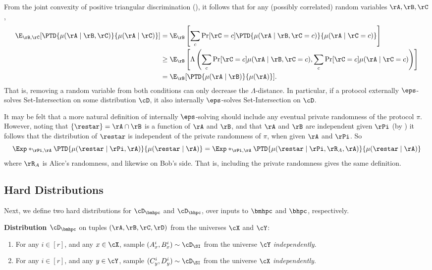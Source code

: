\begin{observation}\label{obs:eps-solving-remove-conditioning}
    From the joint convexity of positive triangular discrimination (), it follows that for any (possibly correlated) random variables $\rA, \rB, \rC$,
\begin{align*}
    \E_{\rB,\rC}[\PTD{\mu(\rA\mid \rB,\rC)}{\mu(\rA\mid \rC)}] %
    & = \E_{\rB}\left[\sum_{c} \Pr[\rC =c] \PTD{\mu(\rA\mid \rB,\rC=c)}{\mu(\rA\mid \rC=c)}\right] \\
    & \ge \E_{\rB}\left[\Lambda\left(\sum_{c} \Pr[\rC =c]\mu(\rA\mid \rB,\rC=c), \sum_{c} \Pr[\rC =c]\mu(\rA\mid \rC=c)\right)\right]\\
    & = \E_{\rB}[\PTD{\mu(\rA\mid \rB)}{\mu(\rA)}].
\end{align*}
That is, removing a random variable from both conditions can only decrease the $\Lambda$-distance. In particular, if a protocol externally $\eps$-solves Set-Intersection on some distribution $\cD$, it also internally $\eps$-solves Set-Intersection on $\cD$.
\end{observation}

\begin{observation}\label{obs:eps-solving-private-randomness}
    It may be felt that a more natural definition of internally $\eps$-solving
    should include any eventual private randomness of the protocol $\pi$.
    However, noting that $\{\restar\} = \rA \cap \rB$ is a function of $\rA$ and
    $\rB$, and that $\rA$ and $\rB$ are independent given $\rPi$ (by
    )
    it follows that the distribution of $\restar$ is independent of the private randomness of $\pi$, when given $\rA$ and $\rPi$. So
    \[
    \Exp*_{\rPi, \rA}{\PTD{\mu(\restar \mid \rPi, \rA)}{\mu(\restar \mid \rA)}} = \Exp*_{\rPi, \rA}{\PTD{\mu(\restar \mid \rPi, \rR_A, \rA)}{\mu(\restar \mid \rA)}}
    \]
    where $\rR_A$ is Alice's randomness, and likewise on Bob's side.
    That is, including the private randomness gives the same definition.
\end{observation}


\subsection{Hard Distributions} \label{sec:distribution}


Next, we define two hard distributions for $\cD_\bmhpc$ and $\cD_\bhpc$,  over inputs to $\bmhpc$ and $\bhpc$, respectively. 


\begin{tbox}
    \textbf{Distribution $\cD_\bmhpc$} on tuples $(\rA,\rB,\rC,\rD)$ from the universes $\cX$ and $\cY$: 

    \begin{enumerate}
		\item For any $i\in [r]$, and any $x \in \cX$, sample $(A^i_x,B^i_x) \sim \cD_\SI$ from the universe $\cY$ \emph{independently}. 
		\item For any $i \in [r]$, and any $y \in \cY$, sample $(C^i_y,D^i_y) \sim \cD_\SI$ from the universe $\cX$ \emph{independently}. 
    \end{enumerate}
\end{tbox}

